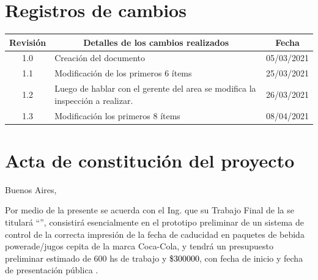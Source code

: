 \documentclass[11pt]{charter}
\begin{document}
\maketitle
\thispagestyle{empty}
\pagebreak


\thispagestyle{empty}
{\setlength{\parskip}{0pt}
\tableofcontents{}
}
\pagebreak


\section{Registros de cambios}
\label{sec:registro}


\begin{table}[ht]
\label{tab:registro}
\centering
\begin{tabularx}{\linewidth}{@{}|c|X|c|@{}}
\hline
\rowcolor[HTML]{C0C0C0} 
Revisión & \multicolumn{1}{c|}{\cellcolor[HTML]{C0C0C0}Detalles de los cambios realizados} & Fecha      \\ \hline
1.0      & Creación del documento                                          & 05/03/2021\\ \hline
1.1      & Modificación de los primeros 6 ítems                                      
& 25/03/2021 \\ \hline
1.2      & Luego de hablar con el gerente del area se modifica la inspección\newline
a realizar.
& 26/03/2021 \\ \hline
1.3		 & Modificación los primeros 8 ítems  
& 08/04/2021 \\ \hline
\end{tabularx}
\end{table}

\pagebreak



\section{Acta de constitución del proyecto}
\label{sec:acta}

\begin{flushright}
Buenos Aires, \fechaInicioName
\end{flushright}

\vspace{2cm}

Por medio de la presente se acuerda con el Ing. \authorname\hspace{1px} que su Trabajo Final de la \degreename\hspace{1px} se titulará ``\ttitle'', consistirá esencialmente en el prototipo preliminar de un sistema de control de la correcta impresión de la fecha de caducidad en paquetes de bebida powerade/jugos cepita de la marca Coca-Cola, y tendrá un presupuesto preliminar estimado de 600 hs de trabajo y \textcolor{black}{\$300000}, con fecha de inicio \fechaInicioName\hspace{1px} y fecha de presentación pública \fechaFinalName.
\end{document}
